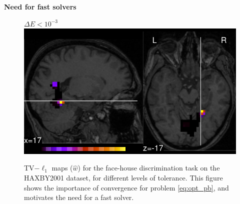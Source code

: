 \documentclass[french]{STIC_poster}
\begin{document}
\begin{frame}[t]
\begin{columns}[t]
\begin{column}{.48\linewidth}
\begin{nbox}[\textwidth]{\textbf{Need for fast solvers}}
\begin{figure}
{{{                                          $\Delta E < 10^{-3}$}}\hspace*{.315\linewidth}}\hfill%
                                    \includegraphics[width=.32\linewidth]{maps/face_vs_house_tol_1e-05.pdf}%
                                    \caption{TV$-\ell_1$ maps ($\hat{w}$) for the face-house discrimination task on
                                      the HAXBY2001 dataset, for different levels of tolerance.
                                      This figure shows the importance of convergence for problem \eqref{eq:opt_pb}, and motivates
                                      the need for a fast solver.}%
                                    \label{fig:maps_tolerance}
                                  \end{figure}

				\end{nbox}
			\end{column}
			\hfill
		\end{columns}
	\end{frame}

 
\end{document}
